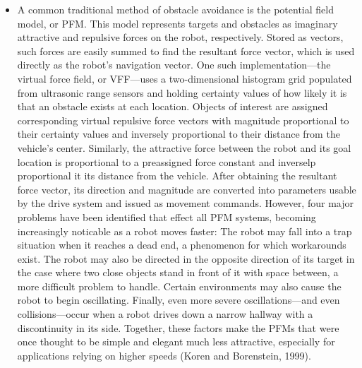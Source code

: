 \documentclass{article}
\begin{document}
\begin{itemize}
\item{A common traditional method of obstacle avoidance is the potential field model, or PFM.  This model represents targets and obstacles as imaginary attractive and repulsive forces on the robot, respectively.  Stored as vectors, such forces are easily summed to find the resultant force vector, which is used directly as the robot's navigation vector.  One such implementation---the virtual force field, or VFF---uses a two-dimensional histogram grid populated from ultrasonic range sensors and holding certainty values of how likely it is that an obstacle exists at each location.  Objects of interest are assigned corresponding virtual repulsive force vectors with magnitude proportional to their certainty values and inversely proportional to their distance from the vehicle's center.  Similarly, the attractive force between the robot and its goal location is proportional to a preassigned force constant and inverselp proportional it its distance from the vehicle.  After obtaining the resultant force vector, its direction and magnitude are converted into parameters usable by the drive system and issued as movement commands.  However, four major problems have been identified that effect all PFM systems, becoming increasingly noticable as a robot moves faster:  The robot may fall into a trap situation when it reaches a dead end, a phenomenon for which workarounds exist.  The robot may also be directed in the opposite direction of its target in the case where two close objects stand in front of it with space between, a more difficult problem to handle.  Certain environments may also cause the robot to begin oscillating.  Finally, even more severe oscillations---and even collisions---occur when a robot drives down a narrow hallway with a discontinuity in its side.  Together, these factors make the PFMs that were once thought to be simple and elegant much less attractive, especially for applications relying on higher speeds (Koren and Borenstein, 1999).}

\end{itemize}
\end{document}
